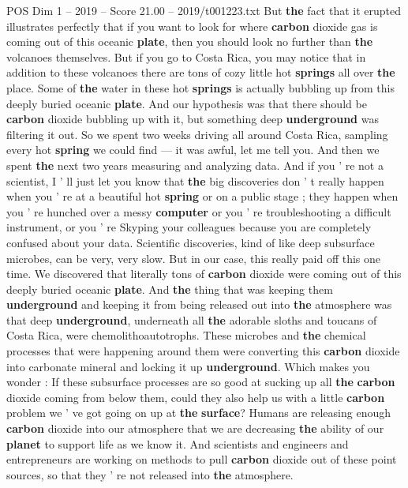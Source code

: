 \begin{textsample}{POS Dim 1 – 2019 – Score 21.00 – 2019/t001223.txt}
But \textbf{the} fact that it erupted illustrates perfectly that if you want to look for where \textbf{carbon} dioxide gas is coming out of this oceanic \textbf{plate}, then you should look no further than \textbf{the} volcanoes themselves.
But if you go to Costa Rica, you may notice that in addition to these volcanoes there are tons of cozy little hot \textbf{springs} all over \textbf{the} place.
Some of \textbf{the} water in these hot \textbf{springs} is actually bubbling up from this deeply buried oceanic \textbf{plate}.
And our hypothesis was that there should be \textbf{carbon} dioxide bubbling up with it, but something deep \textbf{underground} was filtering it out.
So we spent two weeks driving all around Costa Rica, sampling every hot \textbf{spring} we could find — it was awful, let me tell you.
And then we spent \textbf{the} next two years measuring and analyzing data.
And if you ' re not a scientist, I ' ll just let you know that \textbf{the} big discoveries don ' t really happen when you ' re at a beautiful hot \textbf{spring} or on a public stage ; they happen when you ' re hunched over a messy \textbf{computer} or you ' re troubleshooting a difficult instrument, or you ' re Skyping your colleagues because you are completely confused about your data.
Scientific discoveries, kind of like deep subsurface microbes, can be very, very slow.
But in our case, this really paid off this one time.
We discovered that literally tons of \textbf{carbon} dioxide were coming out of this deeply buried oceanic \textbf{plate}.
And \textbf{the} thing that was keeping them \textbf{underground} and keeping it from being released out into \textbf{the} atmosphere was that deep \textbf{underground}, underneath all \textbf{the} adorable sloths and toucans of Costa Rica, were chemolithoautotrophs.
These microbes and \textbf{the} chemical processes that were happening around them were converting this \textbf{carbon} dioxide into carbonate mineral and locking it up \textbf{underground}.
Which makes you wonder : If these subsurface processes are so good at sucking up all \textbf{the} \textbf{carbon} dioxide coming from below them, could they also help us with a little \textbf{carbon} problem we ' ve got going on up at \textbf{the} \textbf{surface}?
Humans are releasing enough \textbf{carbon} dioxide into our atmosphere that we are decreasing \textbf{the} ability of our \textbf{planet} to support life as we know it.
And scientists and engineers and entrepreneurs are working on methods to pull \textbf{carbon} dioxide out of these point sources, so that they ' re not released into \textbf{the} atmosphere.

\end{textsample}
